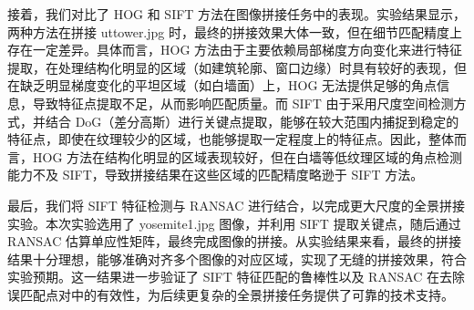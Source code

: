 \documentclass[a4paper, utf8]{ctexart}
\begin{document}
	接着，我们对比了 HOG 和 SIFT 方法在图像拼接任务中的表现。实验结果显示，两种方法在拼接 uttower.jpg 时，最终的拼接效果大体一致，但在细节匹配精度上存在一定差异。具体而言，HOG 方法由于主要依赖局部梯度方向变化来进行特征提取，在处理结构化明显的区域（如建筑轮廓、窗口边缘）时具有较好的表现，但在缺乏明显梯度变化的平坦区域（如白墙面）上，HOG 无法提供足够的角点信息，导致特征点提取不足，从而影响匹配质量。而 SIFT 由于采用尺度空间检测方式，并结合 DoG（差分高斯）进行关键点提取，能够在较大范围内捕捉到稳定的特征点，即使在纹理较少的区域，也能够提取一定程度上的特征点。因此，整体而言，HOG 方法在结构化明显的区域表现较好，但在白墙等低纹理区域的角点检测能力不及 SIFT，导致拼接结果在这些区域的匹配精度略逊于 SIFT 方法。

	最后，我们将 SIFT 特征检测与 RANSAC 进行结合，以完成更大尺度的全景拼接实验。本次实验选用了 yosemite1.jpg 图像，并利用 SIFT 提取关键点，随后通过 RANSAC 估算单应性矩阵，最终完成图像的拼接。从实验结果来看，最终的拼接结果十分理想，能够准确对齐多个图像的对应区域，实现了无缝的拼接效果，符合实验预期。这一结果进一步验证了 SIFT 特征匹配的鲁棒性以及 RANSAC 在去除误匹配点对中的有效性，为后续更复杂的全景拼接任务提供了可靠的技术支持。
	
\end{document}
